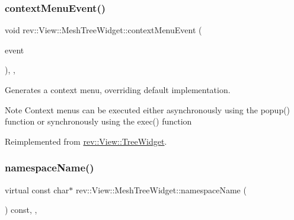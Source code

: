 \mbox{\label{classrev_1_1_view_1_1_mesh_tree_widget_aede9f57981eaf35d876cd10dccd545fa}} 
\subsubsection{\texorpdfstring{contextMenuEvent()}{contextMenuEvent()}}
{\footnotesize\ttfamily void rev\+::\+View\+::\+Mesh\+Tree\+Widget\+::context\+Menu\+Event (\begin{DoxyParamCaption}\item[{Q\+Context\+Menu\+Event $\ast$}]{event }\end{DoxyParamCaption})\hspace{0.3cm}{\ttfamily [override]}, {\ttfamily [protected]}, {\ttfamily [virtual]}}



Generates a context menu, overriding default implementation. 

\begin{DoxyNote}{Note}
Context menus can be executed either asynchronously using the popup() function or synchronously using the exec() function 
\end{DoxyNote}


Reimplemented from \mbox{\hyperlink{classrev_1_1_view_1_1_tree_widget_a47fe709b7b08a5d327a66d091e64820b}{rev\+::\+View\+::\+Tree\+Widget}}.

\mbox{\label{classrev_1_1_view_1_1_mesh_tree_widget_a9051050a76f3eb339fe8eacfac5806ca}} 
\subsubsection{\texorpdfstring{namespaceName()}{namespaceName()}}
{\footnotesize\ttfamily virtual const char$\ast$ rev\+::\+View\+::\+Mesh\+Tree\+Widget\+::namespace\+Name (\begin{DoxyParamCaption}{ }\end{DoxyParamCaption}) const\hspace{0.3cm}{\ttfamily [inline]}, {\ttfamily [override]}, {\ttfamily [virtual]}}



